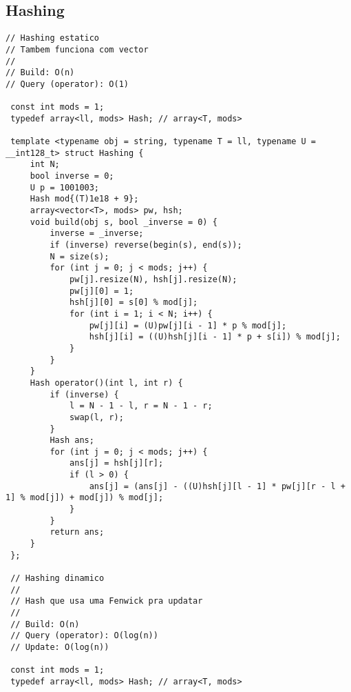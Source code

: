 \documentclass[11pt, a4paper, twoside]{article}
\begin{document}
\subsection{Hashing}
\begin{lstlisting}
// Hashing estatico
// Tambem funciona com vector
//
// Build: O(n)
// Query (operator): O(1)

 const int mods = 1;
 typedef array<ll, mods> Hash; // array<T, mods>
 
 template <typename obj = string, typename T = ll, typename U = __int128_t> struct Hashing {
     int N;
     bool inverse = 0;
     U p = 1001003;
     Hash mod{(T)1e18 + 9};
     array<vector<T>, mods> pw, hsh;
     void build(obj s, bool _inverse = 0) {
         inverse = _inverse;
         if (inverse) reverse(begin(s), end(s));
         N = size(s);
         for (int j = 0; j < mods; j++) {
             pw[j].resize(N), hsh[j].resize(N);
             pw[j][0] = 1;
             hsh[j][0] = s[0] % mod[j];
             for (int i = 1; i < N; i++) {
                 pw[j][i] = (U)pw[j][i - 1] * p % mod[j];
                 hsh[j][i] = ((U)hsh[j][i - 1] * p + s[i]) % mod[j];
             }
         }
     }
     Hash operator()(int l, int r) {
         if (inverse) {
             l = N - 1 - l, r = N - 1 - r;
             swap(l, r);
         }
         Hash ans;
         for (int j = 0; j < mods; j++) {
             ans[j] = hsh[j][r];
             if (l > 0) {
                 ans[j] = (ans[j] - ((U)hsh[j][l - 1] * pw[j][r - l + 1] % mod[j]) + mod[j]) % mod[j];
             }
         }
         return ans;
     }
 };
 
 // Hashing dinamico
 //
 // Hash que usa uma Fenwick pra updatar
 //
 // Build: O(n)
 // Query (operator): O(log(n))
 // Update: O(log(n))
 
 const int mods = 1;
 typedef array<ll, mods> Hash; // array<T, mods>
 

\end{lstlisting}
\end{document}
